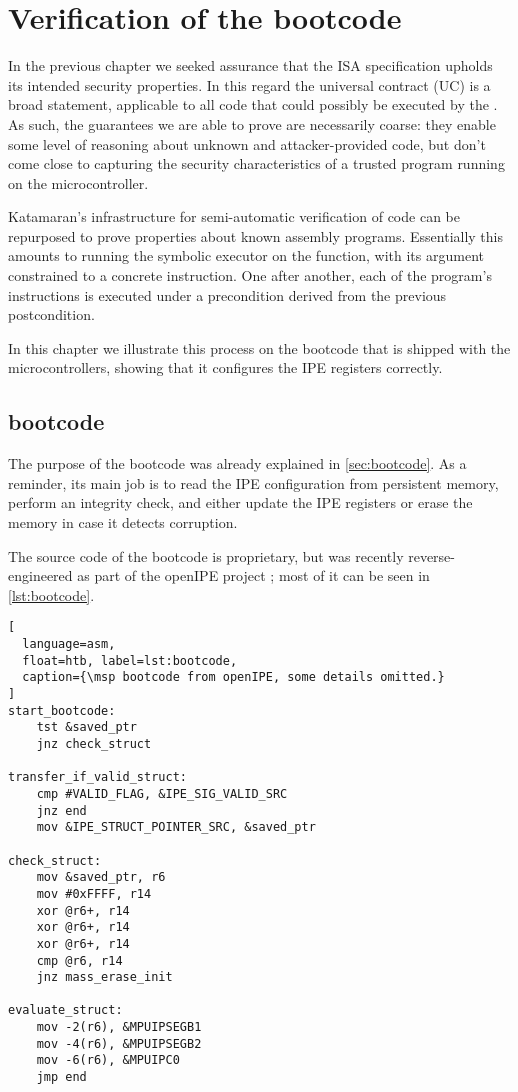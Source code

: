 \chapter{Verification of the \texorpdfstring{\msp}{MSP430} bootcode}
\label{ch:block-verifier}

In the previous chapter we seeked assurance that the ISA specification upholds its intended security properties. In this regard the universal contract (UC) is a broad statement, applicable to all code that could possibly be executed by the \msp. As such, the guarantees we are able to prove are necessarily coarse: they enable some level of reasoning about unknown and attacker-provided code, but don't come close to capturing the security characteristics of a trusted program running on the microcontroller.

Katamaran's infrastructure for semi-automatic verification of \usail code can be repurposed to prove properties about known assembly programs. Essentially this amounts to running the symbolic executor on the  function, with its argument constrained to a concrete instruction. One after another, each of the program's instructions is executed under a precondition derived from the previous postcondition.

In this chapter we illustrate this process on the bootcode that is shipped with the \msp microcontrollers, showing that it configures the IPE registers correctly.

\section{\texorpdfstring{\msp}{MSP430} bootcode}

The purpose of the bootcode was already explained in \cref{sec:bootcode}. As a reminder, its main job is to read the IPE configuration from persistent memory, perform an integrity check, and either update the IPE registers or erase the memory in case it detects corruption.

The source code of the bootcode is proprietary, but was recently reverse-engineered as part of the openIPE project \cite{Bognar2025}; most of it can be seen in \cref{lst:bootcode}.

\begin{lstlisting}[
  language=asm,
  float=htb, label=lst:bootcode,
  caption={\msp bootcode from openIPE, some details omitted.}
]
start_bootcode:
    tst &saved_ptr
    jnz check_struct

transfer_if_valid_struct:
    cmp #VALID_FLAG, &IPE_SIG_VALID_SRC
    jnz end
    mov &IPE_STRUCT_POINTER_SRC, &saved_ptr

check_struct:
    mov &saved_ptr, r6
    mov #0xFFFF, r14
    xor @r6+, r14
    xor @r6+, r14
    xor @r6+, r14
    cmp @r6, r14
    jnz mass_erase_init

evaluate_struct:
    mov -2(r6), &MPUIPSEGB1
    mov -4(r6), &MPUIPSEGB2
    mov -6(r6), &MPUIPC0
    jmp end
\end{lstlisting}

